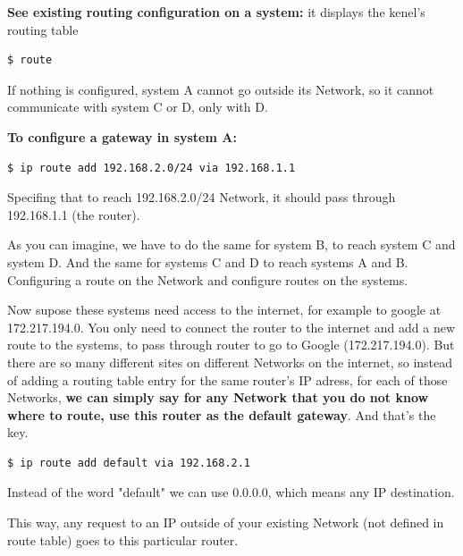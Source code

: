 \documentclass{article}
\newenvironment{blocktemplate}[1]{%
    \tcolorbox[beamer,%
    noparskip,breakable,
    colframe=Blue,%
    colbacklower=LimeGreen!75!LightGreen,%
    title=#1]}%
    {\endtcolorbox}
\newenvironment{codetemplate}[1][]{%
  \mybasecolorbox[#1]
  \itshape
}{%
  \endmybasecolorbox
}
\begin{document}
\textbf{See existing routing configuration on a system:} it displays the kenel's routing table
\begin{codetemplate}{}
\begin{verbatim}
$ route
\end{verbatim}
\end{codetemplate}

If nothing is configured, system A cannot go outside its Network, so it cannot communicate with system C or D, only with D.

\textbf{To configure a gateway in system A:}
\begin{codetemplate}{}
\begin{verbatim}
$ ip route add 192.168.2.0/24 via 192.168.1.1
\end{verbatim}
\end{codetemplate}

Specifing that to reach 192.168.2.0/24 Network, it should pass through 192.168.1.1 (the router).

As you can imagine, we have to do the same for system B, to reach system C and system D. And the same for systems C and D to reach systems A and B. Configuring a route on the Network and configure routes on the systems.

Now supose these systems need access to the internet, for example to google at 172.217.194.0. You only need to connect the router to the internet and add a new route to the systems, to pass through router to go to Google (172.217.194.0). But there are so many different sites on different Networks on the internet, so instead of adding a routing table entry for the same router's IP adress, for each of those Networks, \textbf{we can simply say for any Network that you do not know where to route, use this router as the default gateway}. And that's the key.

\begin{codetemplate}{}
\begin{verbatim}
$ ip route add default via 192.168.2.1
\end{verbatim}
\end{codetemplate}

\begin{blocktemplate}{NOTE}
Instead of the word "default" we can use 0.0.0.0, which means any IP destination.
\end{blocktemplate}

This way, any request to an IP outside of your existing Network (not defined in route table) goes to this particular router. 
\end{document}
